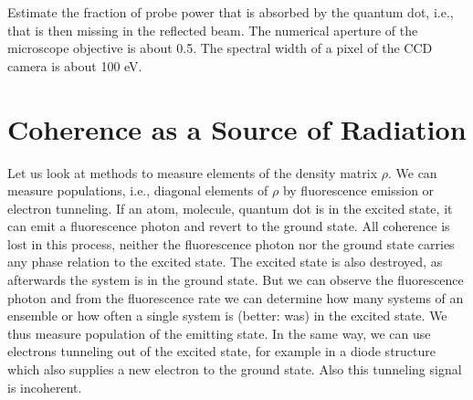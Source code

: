 \begin{questions}

\item Estimate the fraction of probe power that is absorbed by the quantum dot, i.e., that is then missing in the reflected beam. The numerical aperture of the microscope objective is about 0.5. The spectral width of a pixel of the CCD camera is about 100 \textmu eV.

\end{questions}
 

\section{Coherence as a Source of Radiation}


Let us look at methods to measure elements of the density matrix $\rho$. We can measure populations, i.e., diagonal elements of $\rho$ by fluorescence emission or electron tunneling. If an atom, molecule, quantum dot is in the excited state, it can emit a fluorescence photon and revert to the ground state. All coherence is lost in this process, neither the fluorescence photon nor the ground state carries any phase relation to the excited state. The excited state is also destroyed, as afterwards the system is in the ground state. But we can observe the fluorescence photon and from the fluorescence rate we can determine how many systems of an ensemble or how often a single system is (better: was) in the excited state. We thus measure population of the emitting state. In the same way, we can use electrons tunneling out of the excited state, for example in a diode structure which also supplies  a new electron to the ground state. Also this tunneling signal is incoherent.

